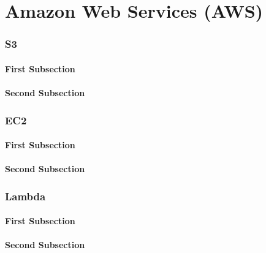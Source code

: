 \documentclass[./FDA_document_template.tex]{subfiles}
\begin{document}
\renewcommand{\onlyinsubfile}[1]{#1}
\renewcommand{\notinsubfile}[1]{}
 
\setcounter{part}{0}
\pagestyle{Standard}

\part{Amazon Web Services (AWS)}
 
 
 
 \section{S3}
\lipsum[1]

\subsection{First Subsection}

\lipsum[2]

\subsection{Second Subsection}

\lipsum[3]
 \section{EC2}
\lipsum[1]

\subsection{First Subsection}

\lipsum[2]

\subsection{Second Subsection}

\lipsum[3]
 \section{Lambda}

\lipsum[1]

\subsection{First Subsection}

\lipsum[2]

\subsection{Second Subsection}

\lipsum[3]

\bigskip
 
\end{document}
